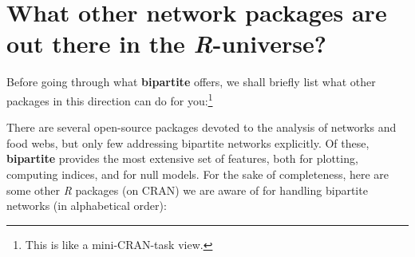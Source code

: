 \documentclass[a4paper, 11pt]{article}\usepackage[]{graphicx}\usepackage[dvipsnames]{xcolor}
\newcommand{\package}[1]{\textbf{#1}}
\newcommand{\proglang}[1]{\textsl{#1}}
\begin{document}
\section{What other network packages are out there in the \proglang{R}-universe?}
Before going through what \package{bipartite} offers, we shall briefly list what other packages in this direction can do for you:\footnote{ This is like a mini-CRAN-task view.}

There are several open-source packages devoted to the analysis of networks and food webs, but only few addressing bipartite networks explicitly. Of these, \package{bipartite} provides the most extensive set of features, both for plotting, computing indices, and for null models. For the sake of completeness, here are some other \proglang{R} packages (on CRAN) we are aware of for handling bipartite networks (in alphabetical order):
\end{document}
